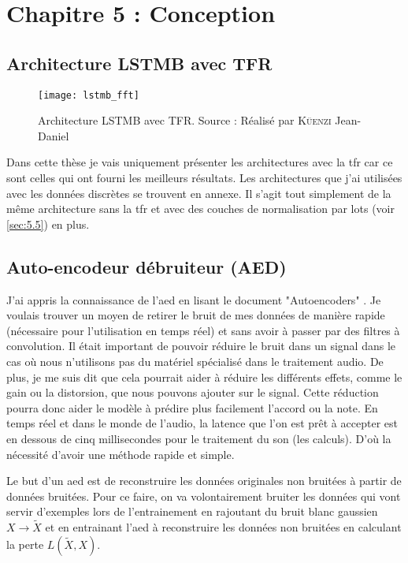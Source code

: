 \chapter{Chapitre 5 : Conception}
\label{chap:5}

\section{Architecture LSTMB avec TFR}
\label{sec:5.1}

\begin{figure}[H]
	\centering
	\texttt{[image: lstmb\_fft]}
	\caption[Architecture LSTMB avec TFR]{Architecture LSTMB avec TFR. Source : Réalisé par \textsc{Küenzi} Jean-Daniel}
	\label{fig:lstmb_fft}
\end{figure}

Dans cette thèse je vais uniquement présenter les architectures avec la \gls{tfr} car ce sont celles qui ont fourni les meilleurs résultats. Les architectures que j'ai utilisées avec les données discrètes se trouvent en annexe. Il s'agit tout simplement de la même architecture sans la \gls{tfr} et avec des couches de normalisation par lots (voir \autoref{sec:5.5}) en plus.

\section{Auto-encodeur débruiteur (AED)}
\label{sec:5.2}

J'ai appris la connaissance de l'\gls{aed} en lisant le document "Autoencoders" \parencite{bank_autoencoders_2021}. Je voulais trouver un moyen de retirer le bruit de mes données de manière rapide (nécessaire pour l'utilisation en temps réel) et sans avoir à passer par des filtres à convolution. Il était important de pouvoir réduire le bruit dans un signal dans le cas où nous n'utilisons pas du matériel spécialisé dans le traitement audio. De plus, je me suis dit que cela pourrait aider à réduire les différents effets, comme le gain ou la distorsion, que nous pouvons ajouter sur le signal. Cette réduction pourra donc aider le modèle à prédire plus facilement l'accord ou la note. En temps réel et dans le monde de l'audio, la latence que l'on est prêt à accepter est en dessous de cinq millisecondes pour le traitement du son (les calculs). D'où la nécessité d'avoir une méthode rapide et simple.

Le but d'un \gls{aed} est de reconstruire les données originales non bruitées à partir de données bruitées. Pour ce faire, on va volontairement bruiter les données qui vont servir d'exemples lors de l'entrainement en rajoutant du bruit blanc gaussien $X\rightarrow\tilde{X}$ et en entrainant l'\gls{aed} à reconstruire les données non bruitées en calculant la perte $L(\tilde{X}, X)$.


